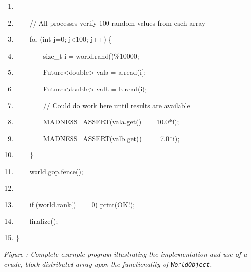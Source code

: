 \documentclass[letterpaper]{article}
\newcounter{Figure}
\renewcommand\theFigure{\arabic{Figure}}
\begin{document}
\begin{center}
\begin{minipage}{}
\begin{enumerate}
\item 
\bigskip
\item {\ttfamily
\ \ \ \ // All processes verify 100 random values from each array}
\item {\ttfamily
\ \ \ \ for (int j=0; j{\textless}100; j++) \{}
\item {\ttfamily
\ \ \ \ \ \ \ \ size\_t i = world.rand()\%10000;}
\item {\ttfamily
\ \ \ \ \ \ \ \ Future{\textless}double{\textgreater} vala = a.read(i);}
\item {\ttfamily
\ \ \ \ \ \ \ \ Future{\textless}double{\textgreater} valb = b.read(i);}
\item {\ttfamily
\ \ \ \ \ \ \ \ // Could do work here until results are available}
\item {\ttfamily
\ \ \ \ \ \ \ \ MADNESS\_ASSERT(vala.get() == 10.0*i);}
\item {\ttfamily
\ \ \ \ \ \ \ \ MADNESS\_ASSERT(valb.get() == \ 7.0*i);}
\item {\ttfamily
\ \ \ \ \}}
\item {\ttfamily
\ \ \ \ world.gop.fence();}
\item 
\bigskip
\item {\ttfamily
\ \ \ \ if (world.rank() == 0) print({\textquotedbl}OK!{\textquotedbl});}
\item {\ttfamily
\ \ \ \ finalize();}
\item {\ttfamily
\}}
\end{enumerate}
{\centering\itshape
Figure {\theFigure\label{seq:refFigure0}}: Complete example program illustrating the
implementation and use of a crude, block-distributed array upon the functionality of \texttt{WorldObject}.
\par}
\end{minipage}
\end{center}
\end{document}
